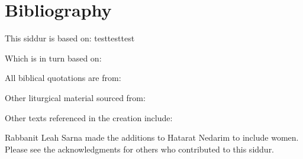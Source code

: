 \documentclass[twoside, openany, parskip=half, 11pt]{book}
\begin{document}
\chapter{Bibliography}
\begin{minipage}{\textwidth}
\begin{english}
This siddur is based on:
\nocite{olastamid}
testtesttest
\printbibliography
%


Which is in turn based on:

All biblical quotations are from:

Other liturgical material sourced from:

Other texts referenced in the creation include:

Rabbanit Leah Sarna made the additions to Hatarat Nedarim to include women. Please see the acknowledgments for others who contributed to this siddur.

\end{english}

\end{minipage}
\end{document}
